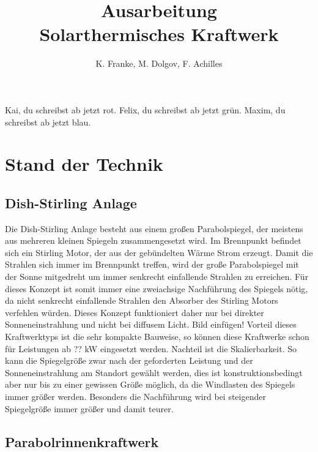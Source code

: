 \documentclass[fontsize=10pt,paper=a4,bibliography=totoc]{scrartcl}
\title{Ausarbeitung\\Solarthermisches Kraftwerk}
\author{K. Franke, M. Dolgov, F. Achilles}
\newcommand{\kai}[1]{{ \color{red} #1 }}
\newcommand{\felix}[1]{{ \color{green} #1}}
\newcommand{\maxim}[1]{{ \color{blue} #1}}
\begin{document}
\maketitle
%
\kai{Kai, du schreibst ab jetzt rot.}\newline
\felix{Felix, du schreibst ab jetzt grün.}\newline
\maxim{Maxim, du schreibst ab jetzt blau.}\newline

\section{Stand der Technik}

\subsection{Dish-Stirling Anlage}
Die Dish-Stirling Anlage besteht aus einem großen Parabolspiegel, der meistens aus mehreren kleinen Spiegeln zusammengesetzt wird. Im Brennpunkt befindet sich ein Stirling Motor, der aus der gebündelten Wärme Strom erzeugt. Damit die Strahlen sich immer im Brennpunkt treffen, wird der große Parabolspiegel mit der Sonne mitgedreht um immer senkrecht einfallende Strahlen zu erreichen. Für dieses Konzept ist somit immer eine zweiachsige Nachführung des Spiegels nötig, da nicht senkrecht einfallende Strahlen den Absorber des Stirling Motors verfehlen würden. Dieses Konzept funktioniert daher nur bei direkter Sonneneinstrahlung und nicht bei diffusem Licht. Bild einfügen! Vorteil dieses Kraftwerktyps ist die sehr kompakte Bauweise, so können diese Kraftwerke schon für Leistungen ab ??
 kW eingesetzt werden. Nachteil ist die Skalierbarkeit. So kann die Spiegelgröße zwar nach der geforderten Leistung und der Sonneneinstrahlung am Standort gewählt werden, dies ist konstruktionsbedingt aber nur bis zu einer gewissen Größe möglich, da die Windlasten des Spiegels immer größer werden. Besonders die Nachführung wird bei steigender Spiegelgröße immer größer und damit teurer.
 
\subsection{Parabolrinnenkraftwerk}
\end{document}
